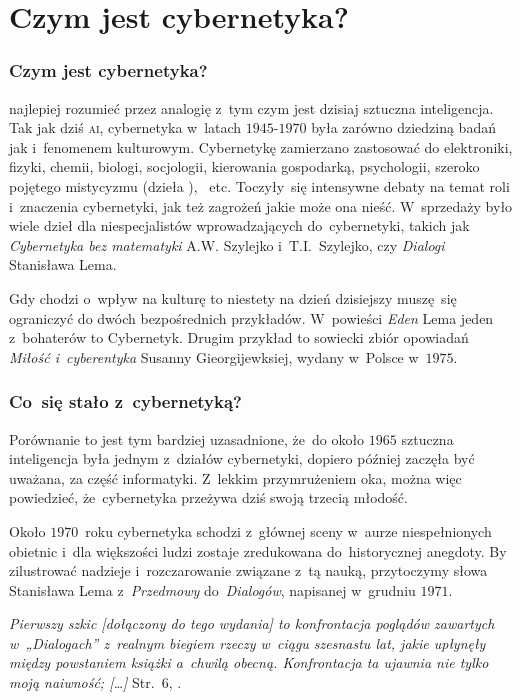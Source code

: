 \documentclass[10pt,t]{beamer}
\begin{document}
\section{Czym jest cybernetyka?}


\begin{frame}
  \frametitle{Czym jest cybernetyka?}


  najlepiej rozumieć przez analogię z~tym czym jest dzisiaj sztuczna
  inteligencja. Tak jak dziś \textsc{ai}, cybernetyka w~latach
  $1945\text{-}1970$ była zarówno dziedziną badań jak i~fenomenem
  kulturowym. Cybernetykę zamierzano zastosować do elektroniki, fizyki,
  chemii, biologi, socjologii, kierowania gospodarką, psychologii, szeroko
  pojętego mistycyzmu (dzieła
  ), ~etc. Toczyły~się intensywne debaty na temat roli i~znaczenia
  cybernetyki, jak też zagrożeń jakie może ona nieść. W~sprzedaży było
  wiele dzieł dla niespecjalistów wprowadzających do~cybernetyki, takich jak
  \textit{Cybernetyka bez matematyki} A.W. Szylejko i~T.I.~Szylejko, czy
  \textit{Dialogi} Stanisława Lema.

  Gdy chodzi o~wpływ na kulturę to niestety na dzień dzisiejszy muszę~się
  ograniczyć do dwóch bezpośrednich przykładów. W~powieści \textit{Eden}
  Lema jeden z~bohaterów to Cybernetyk. Drugim przykład to sowiecki zbiór
  opowiadań \textit{Miłość i~cyberentyka} Susanny Gieorgijewksiej, wydany
  w~Polsce w~$1975$.

\end{frame}





\begin{frame}
  \frametitle{Co~się stało z~cybernetyką?}


  Porównanie to jest tym bardziej uzasadnione, że~do około $1965$ sztuczna
  inteligencja była jednym z~działów cybernetyki, dopiero później
  zaczęła być uważana, za część informatyki. Z~lekkim przymrużeniem oka,
  można więc powiedzieć, że~cybernetyka przeżywa dziś swoją trzecią młodość.

  Około $1970$~roku cybernetyka schodzi z~głównej sceny w~aurze
  niespełnionych obietnic i~dla większości ludzi zostaje zredukowana
  do~historycznej anegdoty. By zilustrować nadzieje i~rozczarowanie związane
  z~tą nauką, przytoczymy słowa Stanisława Lema z~\textit{Przedmowy}
  do~\textit{Dialogów}, napisanej w~grudniu $1971$.

  \textit{Pierwszy szkic [dołączony do tego wydania] to konfrontacja
    poglądów zawartych w~„Dialogach” z~realnym biegiem rzeczy w~ciągu
    szesnastu lat, jakie upłynęły między powstaniem książki a~chwilą
    obecną. Konfrontacja ta ujawnia nie tylko moją naiwność; [\ldots]}
  Str.~$6$, \parencite{Lem-Dialogi-Vol-I-Pub-1996}.

\end{frame}
\end{document}
